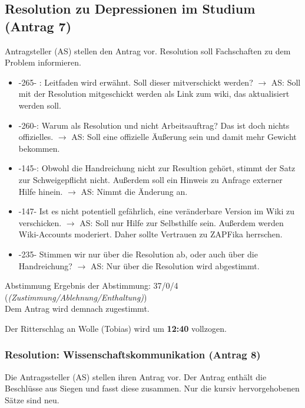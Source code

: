   \subsection{Resolution zu Depressionen im Studium (Antrag 7)}
    Antragsteller (AS) stellen den Antrag vor. Resolution soll Fachschaften zu dem Problem informieren.

    \begin{itemize}
      \item -265- : Leitfaden wird erwähnt. Soll dieser mitverschickt werden?
        $\rightarrow$ AS: Soll mit der Resolution mitgeschickt werden als Link zum wiki, das aktualisiert werden soll.
      \item -260-: Warum als Resolution und nicht Arbeitsauftrag? Das ist doch nichts offizielles.
        $\rightarrow$ AS: Soll eine offizielle Äußerung sein und damit mehr Gewicht bekommen.
      \item -145-: Obwohl die Handreichung nicht zur Resultion gehört, stimmt der Satz zur Schweigepflicht nicht. Außerdem soll ein Hinweis zu Anfrage externer Hilfe hinein.
        $\rightarrow$ AS: Nimmt die Änderung an.
      \item -147- Ist es nicht potentiell gefährlich, eine veränderbare Version im Wiki zu verschicken.
        $\rightarrow$ AS: Soll nur Hilfe zur Selbsthilfe sein. Außerdem werden Wiki-Accounts moderiert. Daher sollte Vertrauen zu ZAPFika herrschen.
      \item -235- Stimmen wir nur über die Resolution ab, oder auch über die Handreichung?
        $\rightarrow$ AS: Nur über die Resolution wird abgestimmt.
    \end{itemize}

    \begin{success}{Abstimmung}
      Ergebnis der Abstimmung: 37/0/4 (\textit{(Zustimmung/Ablehnung/Enthaltung)}) \\
      Dem Antrag wird demnach zugestimmt.
    \end{success}

    Der Ritterschlag an Wolle (Tobias) wird um \textbf{12:40} vollzogen.

  \subsubsection{Resolution: Wissenschaftskommunikation (Antrag 8)}
    Die Antragssteller (AS) stellen ihren Antrag vor.
    Der Antrag enthält die Beschlüsse aus Siegen und fasst diese zusammen.
    Nur die kursiv hervorgehobenen Sätze sind neu.

